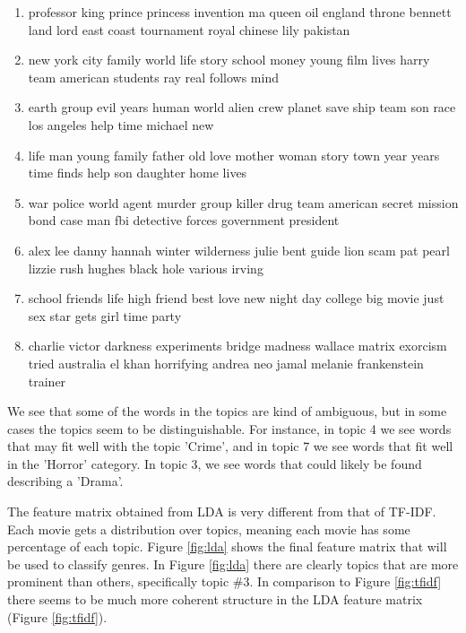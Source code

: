 \documentclass[11pt]{article}
\begin{document}
{\small
\begin{enumerate}
\setlength\itemsep{0.0em}

\item professor king prince princess invention ma queen oil england throne bennett land lord east coast tournament royal chinese lily pakistan

\item new york city family world life story school money young film lives harry team american students ray real follows mind

\item earth group evil years human world alien crew planet save ship team son race los angeles help time michael new

\item life man young family father old love mother woman story town year years time finds help son daughter home lives

\item war police world agent murder group killer drug team american secret mission bond case man fbi detective forces government president

\item alex lee danny hannah winter wilderness julie bent guide lion scam pat pearl lizzie rush hughes black hole various irving

\item school friends life high friend best love new night day college big movie just sex star gets girl time party

\item charlie victor darkness experiments bridge madness wallace matrix exorcism tried australia el khan horrifying andrea neo jamal melanie frankenstein trainer
\end{enumerate}
}

We see that some of the words in the topics are kind of ambiguous, but in some cases the topics seem to be distinguishable. For instance, in topic 4 we see words that may fit well with the topic 'Crime', and in topic 7 we see words that fit well in the 'Horror' category. In topic 3, we see words that could likely be found describing a 'Drama'.

The feature matrix obtained from LDA is very different from that of TF-IDF. Each movie gets a distribution over topics, meaning each movie has some percentage of each topic. Figure \ref{fig:lda} shows the final feature matrix that will be used to classify genres. In Figure \ref{fig:lda} there are clearly topics that are more prominent than others, specifically topic \#3. In comparison to Figure \ref{fig:tfidf} there seems to be much more coherent structure in the LDA feature matrix (Figure \ref{fig:tfidf}).
\end{document}
